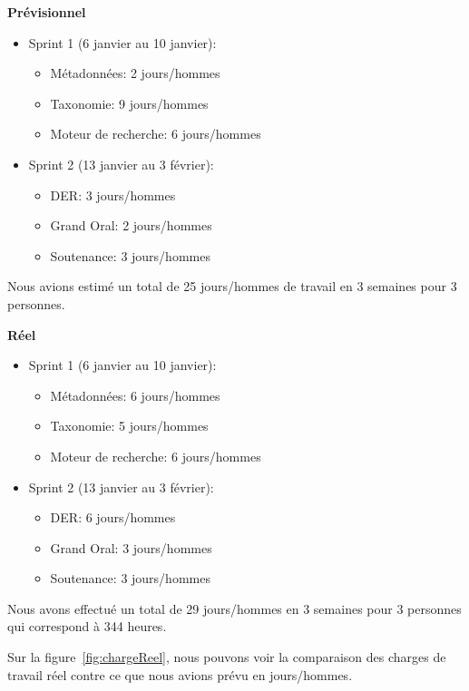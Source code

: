 \textbf{Prévisionnel} 
\begin{itemize}
    \item Sprint 1 (6 janvier au 10 janvier):
        \begin{itemize}
            \item Métadonnées: 2 jours/hommes
            \item Taxonomie: 9 jours/hommes
            \item Moteur de recherche: 6 jours/hommes
        \end{itemize}
    \item Sprint 2 (13 janvier au 3 février):
    \begin{itemize}
        \item DER\@: 3 jours/hommes
        \item Grand Oral: 2 jours/hommes
        \item Soutenance:  3 jours/hommes
    \end{itemize}
\end{itemize} 

Nous avions estimé un total de 25 jours/hommes de travail en 3 semaines pour 3 personnes.


\textbf{Réel}

\begin{itemize}
    \item Sprint 1 (6 janvier au 10 janvier):
        \begin{itemize}
            \item Métadonnées: 6 jours/hommes
            \item Taxonomie: 5 jours/hommes 
            \item Moteur de recherche: 6 jours/hommes
        \end{itemize}
    \item Sprint 2 (13 janvier au 3 février):
    \begin{itemize}
        \item DER\@: 6 jours/hommes 
        \item Grand Oral: 3 jours/hommes 
        \item Soutenance:  3 jours/hommes 
    \end{itemize}
\end{itemize}

Nous avons effectué un total de 29 jours/hommes en 3 semaines pour 3 personnes qui correspond à 344 heures.

Sur la figure~\ref{fig:chargeReel}, nous pouvons voir la comparaison des charges de travail réel contre ce que nous avions prévu en jours/hommes.

